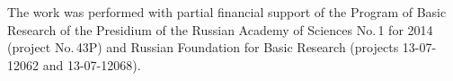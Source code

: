 


\Ack
\noindent
  The work was performed with partial financial support of the Program of Basic
Research of the Presidium of the Russian Academy of Sciences No.\,1 for
2014 (project No.\,43P) and Russian Foundation for Basic Research
(projects 13-07-12062 and 13-07-12068).


  \begin{multicols}{2}

\renewcommand{\bibname}{\protect\rmfamily References}


\end{multicols}
